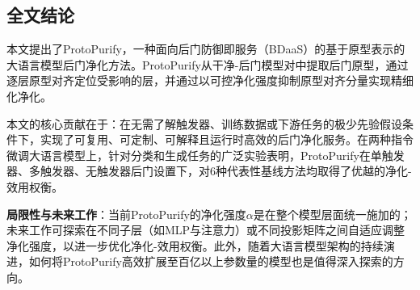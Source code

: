 \subsection{全文结论}

本文提出了ProtoPurify，一种面向后门防御即服务（BDaaS）的基于原型表示的大语言模型后门净化方法。ProtoPurify从干净-后门模型对中提取后门原型，通过逐层原型对齐定位受影响的层，并通过以可控净化强度抑制原型对齐分量实现精细化净化。

本文的核心贡献在于：在无需了解触发器、训练数据或下游任务的极少先验假设条件下，实现了可复用、可定制、可解释且运行时高效的后门净化服务。在两种指令微调大语言模型上，针对分类和生成任务的广泛实验表明，ProtoPurify在单触发器、多触发器、无触发器后门设置下，对6种代表性基线方法均取得了优越的净化-效用权衡。

\textbf{局限性与未来工作}：当前ProtoPurify的净化强度$\alpha$是在整个模型层面统一施加的；未来工作可探索在不同子层（如MLP与注意力）或不同投影矩阵之间自适应调整净化强度，以进一步优化净化-效用权衡。此外，随着大语言模型架构的持续演进，如何将ProtoPurify高效扩展至百亿以上参数量的模型也是值得深入探索的方向。
